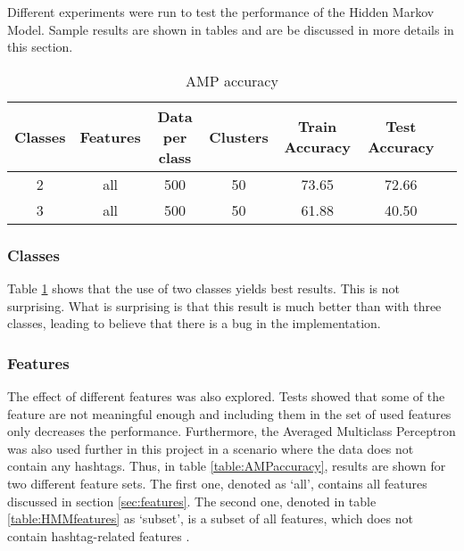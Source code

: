 
\begin{comment}
Experiments / Empirical evaluation (roughly 2-3 pages)
• Any details about experiments (dataset sizes, parameter selection, etc)
• Results
• Analysis (discussion of results / visualization / findings / etc)
\end{comment}


Different experiments were run to test the performance of the Hidden Markov Model. Sample results are shown in tables and are be discussed in more details in this section.
\begin{table}[h!]
\begin{center}
\begin{tabular}{| c | c | c | c | c | c | c |}
\hline
 {\textbf{Classes}} 			& {\textbf{Features}} 
 & {\textbf{Data per class}} 					& {\textbf{Clusters}} 
 & {\textbf{Train Accuracy}} 					& {\textbf{Test Accuracy}} 
 \\
\hline
2 			& all 				& 500 		& 50			& 73.65		& 72.66 		\\
3 			& all 				& 500 		& 50			& 61.88		& 40.50 		\\
\hline
\end{tabular}
\caption{AMP accuracy}
\label{table:HMMaccuracy}
\end{center}
\end{table}

\subsubsection*{Classes} 
Table \ref{table:HMMaccuracy} shows that the use of two classes yields best results. This is not surprising. What is surprising is that this result is much better than with three classes, leading to believe that there is a bug in the implementation. 

\subsubsection*{Features}


The effect of different features was also explored. Tests showed that some of the feature are not meaningful enough and including them in the set of used features only decreases the performance. Furthermore, the Averaged Multiclass Perceptron was also used further in this project in a scenario where the data does not contain any hashtags. Thus, in table \ref{table:AMPaccuracy}, results are shown for two different feature sets. The first one, denoted as `all', contains all features discussed in section \ref{sec:features}.
The second one, denoted in table \ref{table:HMMfeatures} as `subset', is a subset of all features, which does not contain hashtag-related features .

